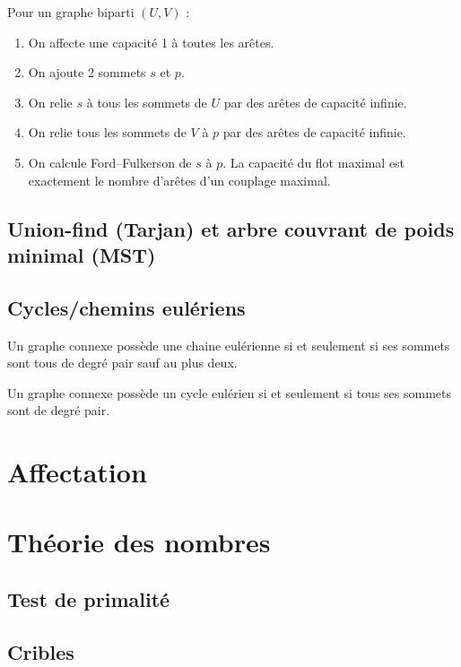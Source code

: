 \documentclass{article}
\begin{document}
\noindent Pour un graphe biparti $(U,V)$ :
\begin{enumerate}
\item On affecte une capacité 1 à toutes les arêtes.
\item On ajoute 2 sommets $s$ et $p$.
\item On relie $s$ à tous les sommets de $U$ par des arêtes de capacité infinie.
\item On relie tous les sommets de $V$ à $p$ par des arêtes de capacité infinie.
\item On calcule Ford--Fulkerson de $s$ à $p$. La capacité du flot maximal est exactement le nombre d'arêtes d'un couplage maximal.
\end{enumerate}

\subsection{Union-find (Tarjan) et arbre couvrant de poids minimal (MST)}


\subsection{Cycles/chemins eulériens}

Un graphe connexe possède une chaine eulérienne si et
seulement si ses sommets sont tous de degré pair sauf au plus
deux.

Un graphe connexe possède un cycle eulérien si et seulement si tous ses sommets sont de degré pair.

\section{Affectation}


\section{Th\'eorie des nombres}
\subsection{Test de primalité}


\subsection{Cribles}
\end{document}
